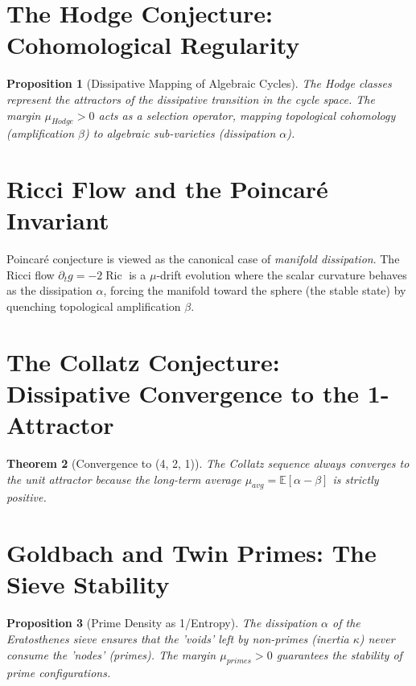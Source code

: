 \documentclass[11pt,a4paper]{amsart}
\newtheorem{theorem}{Theorem}[section]
\newtheorem{proposition}[theorem]{Proposition}
\newcommand{\alphacoeff}{\ensuremath{\alpha}}
\newcommand{\betacoeff}{\ensuremath{\beta}}
\newcommand{\kappacoeff}{\ensuremath{\kappa}}
\newcommand{\mumargin}{\ensuremath{\mu}}
\begin{document}
\section{The Hodge Conjecture: Cohomological Regularity}
\begin{proposition}[Dissipative Mapping of Algebraic Cycles]
The Hodge classes represent the \emph{attractors} of the dissipative
transition in the cycle space. The margin $\mumargin_{Hodge} > 0$
acts as a selection operator, mapping topological cohomology (amplification
$\betacoeff$) to algebraic sub-varieties (dissipation $\alphacoeff$).
\end{proposition}

\section{Ricci Flow and the Poincaré Invariant}
Poincaré conjecture is viewed as the canonical case of \emph{manifold dissipation}. The Ricci
flow $\partial_t g = -2\operatorname{Ric}$ is a $\mumargin$-drift evolution
where the scalar curvature behaves as the dissipation $\alphacoeff$, forcing
the manifold toward the sphere (the stable state) by quenching
topological amplification $\betacoeff$.

\section{The Collatz Conjecture: Dissipative Convergence to the 1-Attractor}
\begin{theorem}[Convergence to (4, 2, 1)]
The Collatz sequence always converges to the unit attractor because
the long-term average $\mumargin_{avg} = \mathbb{E}[\alphacoeff - \betacoeff]$
is strictly positive.
\end{theorem}

\section{Goldbach and Twin Primes: The Sieve Stability}
\begin{proposition}[Prime Density as 1/Entropy]
The dissipation $\alphacoeff$ of the Eratosthenes sieve ensures that
the 'voids' left by non-primes (inertia $\kappacoeff$) never consume
the 'nodes' (primes). The margin $\mumargin_{primes} > 0$
guarantees the stability of prime configurations.
\end{proposition}
\end{document}

